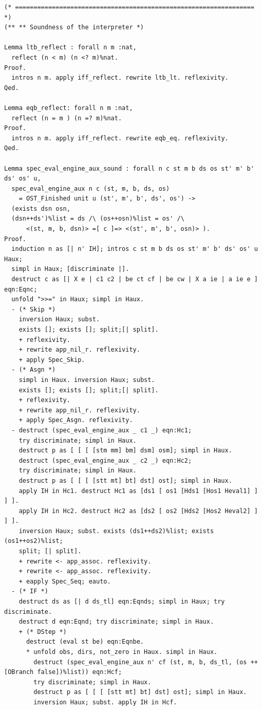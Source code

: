 \documentclass[12pt]{report}
\begin{document}
\begin{verbatim}
(* ================================================================= *)
(** ** Soundness of the interpreter *)

Lemma ltb_reflect : forall n m :nat,
  reflect (n < m) (n <? m)%nat.
Proof.
  intros n m. apply iff_reflect. rewrite ltb_lt. reflexivity.
Qed.

Lemma eqb_reflect: forall n m :nat,
  reflect (n = m ) (n =? m)%nat.
Proof.
  intros n m. apply iff_reflect. rewrite eqb_eq. reflexivity.
Qed.

Lemma spec_eval_engine_aux_sound : forall n c st m b ds os st' m' b' ds' os' u,
  spec_eval_engine_aux n c (st, m, b, ds, os)
    = OST_Finished unit u (st', m', b', ds', os') ->
  (exists dsn osn,
  (dsn++ds')%list = ds /\ (os++osn)%list = os' /\
      <(st, m, b, dsn)> =[ c ]=> <(st', m', b', osn)> ).
Proof.
  induction n as [| n' IH]; intros c st m b ds os st' m' b' ds' os' u Haux;
  simpl in Haux; [discriminate |].
  destruct c as [| X e | c1 c2 | be ct cf | be cw | X a ie | a ie e ] eqn:Eqnc;
  unfold ">>=" in Haux; simpl in Haux.
  - (* Skip *)
    inversion Haux; subst.
    exists []; exists []; split;[| split].
    + reflexivity.
    + rewrite app_nil_r. reflexivity.
    + apply Spec_Skip.
  - (* Asgn *)
    simpl in Haux. inversion Haux; subst.
    exists []; exists []; split;[| split].
    + reflexivity.
    + rewrite app_nil_r. reflexivity.
    + apply Spec_Asgn. reflexivity.
  - destruct (spec_eval_engine_aux _ c1 _) eqn:Hc1;
    try discriminate; simpl in Haux.
    destruct p as [ [ [ [stm mm] bm] dsm] osm]; simpl in Haux.
    destruct (spec_eval_engine_aux _ c2 _) eqn:Hc2;
    try discriminate; simpl in Haux.
    destruct p as [ [ [ [stt mt] bt] dst] ost]; simpl in Haux.
    apply IH in Hc1. destruct Hc1 as [ds1 [ os1 [Hds1 [Hos1 Heval1] ] ] ].
    apply IH in Hc2. destruct Hc2 as [ds2 [ os2 [Hds2 [Hos2 Heval2] ] ] ].
    inversion Haux; subst. exists (ds1++ds2)%list; exists (os1++os2)%list;
    split; [| split].
    + rewrite <- app_assoc. reflexivity.
    + rewrite <- app_assoc. reflexivity.
    + eapply Spec_Seq; eauto.
  - (* IF *)
    destruct ds as [| d ds_tl] eqn:Eqnds; simpl in Haux; try discriminate.
    destruct d eqn:Eqnd; try discriminate; simpl in Haux.
    + (* DStep *)
      destruct (eval st be) eqn:Eqnbe.
      * unfold obs, dirs, not_zero in Haux. simpl in Haux.
        destruct (spec_eval_engine_aux n' cf (st, m, b, ds_tl, (os ++ [OBranch false])%list)) eqn:Hcf;
        try discriminate; simpl in Haux.
        destruct p as [ [ [ [stt mt] bt] dst] ost]; simpl in Haux.
        inversion Haux; subst. apply IH in Hcf.

\end{verbatim}
\end{document}

